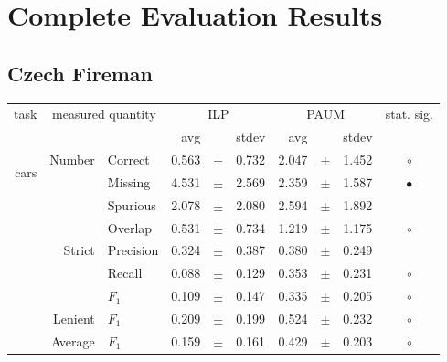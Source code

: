 \chapter{Complete Evaluation Results}

\section{Czech Fireman} \label{sec:complete_eval_fire}

\begin{longtable}{|r|r|l||rcl|rcl|c|}
\hline
\multirow{2}{*}{task} & \multicolumn{2}{|c||}{\multirow{2}{*}{measured quantity}} & \multicolumn{3}{|c|}{ILP} & \multicolumn{3}{|c|}{PAUM} & \multirow{2}{*}{ stat. sig.}\\
\cline{4-9}
  & \multicolumn{2}{|c||}{} &  avg  &    &  stdev  &  avg  &    &  stdev  & \\
\hline
\endhead
\hline
\hline
\multirow{11}{*}{\begin{sideways}cars\end{sideways} }
             & \multirow{4}{*}{    Number} &         Correct &       0.563 &  $\pm$  &       0.732 &       2.047 &  $\pm$  &       1.452 & $\circ$ \\
\cline{3-10} &                             &         Missing &       4.531 &  $\pm$  &       2.569 &       2.359 &  $\pm$  &       1.587 & $\bullet$ \\
\cline{3-10} &                             &        Spurious &       2.078 &  $\pm$  &       2.080 &       2.594 &  $\pm$  &       1.892 &  \\
\cline{3-10} &                             &         Overlap &       0.531 &  $\pm$  &       0.734 &       1.219 &  $\pm$  &       1.175 & $\circ$ \\
\cline{2-10} & \multirow{3}{*}{    Strict} &       Precision &       0.324 &  $\pm$  &       0.387 &       0.380 &  $\pm$  &       0.249 &  \\
\cline{3-10} &                             &          Recall &       0.088 &  $\pm$  &       0.129 &       0.353 &  $\pm$  &       0.231 & $\circ$ \\
\cline{3-10} &                             &           $F_1$ &       0.109 &  $\pm$  &       0.147 &       0.335 &  $\pm$  &       0.205 & $\circ$ \\
\cline{2-10} &                     Lenient &           $F_1$ &       0.209 &  $\pm$  &       0.199 &       0.524 &  $\pm$  &       0.232 & $\circ$ \\
\cline{2-10} &                     Average &           $F_1$ &       0.159 &  $\pm$  &       0.161 &       0.429 &  $\pm$  &       0.203 & $\circ$ \\

\end{longtable}
